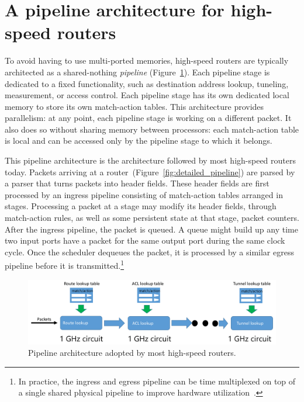 \section{A pipeline architecture for high-speed routers}
\label{s:router_pipeline_arch}

To avoid having to use multi-ported memories, high-speed routers are typically
architected as a shared-nothing {\em pipeline} (Figure~\ref{fig:pipeline}). Each pipeline stage is
dedicated to a fixed functionality, such as destination address lookup,
tuneling, measurement, or access control. Each pipeline stage has its own
dedicated local memory to store its own match-action tables. This architecture provides parallelism: at any point, each
pipeline stage is working on a different packet. It also does so without
sharing memory between processors: each match-action table is local and can be
accessed only by the pipeline stage to which it belongs.

This pipeline architecture is the architecture followed by most high-speed
routers today. Packets arriving at a
router~(Figure~\ref{fig:detailed_pipeline}) are parsed by a parser that turns
packets into header fields. These header fields are first processed by an
ingress pipeline consisting of match-action tables arranged in stages.
Processing a packet at a stage may modify its header fields, through
match-action rules, as well as some persistent state at that stage, \eg packet
counters. After the ingress pipeline, the packet is queued. A queue might build
up any time two input ports have a packet for the same output port during the
same clock cycle. Once the scheduler dequeues the packet, it is processed by a
similar egress pipeline before it is transmitted.\footnote{In practice, the
ingress and egress pipeline can be time multiplexed on top of a single shared
physical pipeline to improve hardware utilization~\cite{rmt}.}

\begin{figure}[!t]
\includegraphics[width=\textwidth]{pipeline.pdf}
\caption{Pipeline architecture adopted by most high-speed routers.}
\label{fig:pipeline}
\end{figure}

